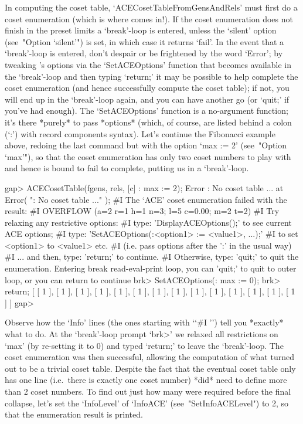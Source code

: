 In computing  the  coset  table,  `ACECosetTableFromGensAndRels'  must
first do a coset enumeration (which is where {\ACE} comes in!). If the
coset  enumeration  does  not  finish   in   the   preset   limits   a
`break'-loop{\undoquotes{}}        is
entered, unless the `silent' option (see~"Option `silent'") is set, in
which case it returns `fail'. In the  event  that  a  `break'-loop  is
entered, don't despair or  be  frightened  by  the  word  `Error';  by
tweaking  {\ACE}'s  options  via  the  `SetACEOptions'  function  that
becomes available in the `break'-loop and then typing `return;' it may
be possible to help {\ACE} complete the coset enumeration  (and  hence
successfully compute the coset table); if not, you will end up in  the
`break'-loop again, and you can have another go (or `quit;' if  you've
had enough). The `SetACEOptions' function is a  no-argument  function;
it's there *purely* to pass *options* (which, of  course,  are  listed
behind a colon (`:') with record components  syntax).  Let's  continue
the Fibonacci example above, redoing the last  command  but  with  the
option `max := 2' (see~"Option `max'"), so that the coset  enumeration
has only two coset numbers to play with and hence is bound to fail  to
complete, putting us in a `break'-loop.

\beginexample
gap> ACECosetTable(fgens, rels, [c] : max := 2);
Error : No coset table ... at
Error( ": No coset table ..." );
#I  The `ACE' coset enumeration failed with the result:
#I  OVERFLOW (a=2 r=1 h=1 n=3; l=5 c=0.00; m=2 t=2)
#I  Try relaxing any restrictive options:
#I  type: 'DisplayACEOptions();' to see current ACE options;
#I  type: 'SetACEOptions(:<option1> := <value1>, ...);'
#I  to set <option1> to <value1> etc.
#I  (i.e. pass options after the ':' in the usual way)
#I  ... and then, type: 'return;' to continue.
#I  Otherwise, type: 'quit;' to quit the enumeration.
Entering break read-eval-print loop, you can 'quit;' to quit to outer loop,
or you can return to continue
brk> SetACEOptions(: max := 0);
brk> return;
[ [ 1 ], [ 1 ], [ 1 ], [ 1 ], [ 1 ], [ 1 ], [ 1 ], [ 1 ], [ 1 ], [ 1 ], 
  [ 1 ], [ 1 ], [ 1 ], [ 1 ] ]
gap>
\endexample

Observe how the `Info' lines (the  ones  starting  with  \lq{}`\#I '')
tell you *exactly* what to do. At the `break'-loop  prompt  `brk>'  we
relaxed all restrictions on `max' (by re-setting it to  0)  and  typed
`return;' to leave the `break'-loop. The coset  enumeration  was  then
successful, allowing the computation  of  what  turned  out  to  be  a
trivial coset table. Despite the fact that the  eventual  coset  table
only has one line (i.e.~there is  exactly  one  coset  number)  {\ACE}
*did* need to define more than 2 coset numbers. To find out  just  how
many  were  required  before  the  final  collapse,  let's   set   the
`InfoLevel' of `InfoACE' (see~"SetInfoACELevel") to  2,  so  that  the
{\ACE} enumeration result is printed.

